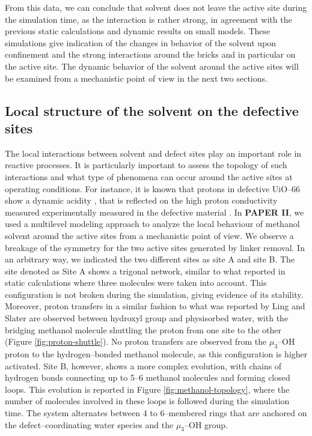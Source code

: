 \npar
From this data, we can conclude that solvent does not leave the active site during the simulation time, as the interaction is rather strong, in agreement with the previous static calculations and dynamic results on small models. These simulations give indication of the changes in behavior of the solvent upon confinement and the strong interactions around the bricks and in particular on the active site. The dynamic behavior of the solvent around the active sites will be examined from a mechanistic point of view in the next two sections.

\subsection*{Local structure of the solvent on the defective sites}
The local interactions between solvent and defect sites play an important role in reactive processes. It is particularly important to assess the topology of such interactions and what type of phenomena can occur around the active sites at operating conditions. For instance, it is known that protons in defective UiO--66 show a dynamic acidity \cite{ling2016dynamic}, that is reflected on the high proton conductivity measured experimentally measured in the defective material \cite{taylor2015defect}.
\npar
In \textbf{PAPER II}, we used a multilevel modeling approach to analyze the local behaviour of methanol solvent around the active sites from a mechanistic point of view. We observe a breakage of the symmetry for the two active sites generated by linker removal. In an arbitrary way, we indicated the two different sites as site A and site B. The site denoted as Site A shows a trigonal network, similar to what reported in static calculations where three molecules were taken into account. This configuration is not broken during the simulation, giving evidence of its stability. Moreover, proton transfers in a similar fashion to what was reported by Ling and Slater \cite{ling2016dynamic} are observed between hydroxyl group and physisorbed water, with the bridging methanol molecule shuttling the proton from one site to the other (Figure \ref{fig:proton-shuttle}). No proton transfers are observed from the $\mu_3$--OH proton to the hydrogen--bonded methanol molecule, as this configuration is higher activated. Site B, however, shows a more complex evolution, with chains of hydrogen bonds connecting up to 5--6 methanol molecules and forming closed loops. This evolution is reported in Figure \ref{fig:methanol-topology}, where the number of molecules involved in these loops is followed during the simulation time. The system alternates between 4 to 6--membered rings that are anchored on the defect--coordinating water species and the $\mu_3$--OH group. 
